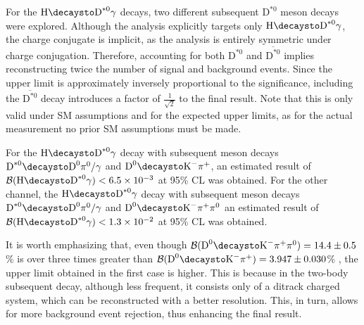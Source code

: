 For the $\text{H}\decaysto \text{D}^{*0}\gamma$ decays, two different subsequent $\text{D}^{*0}$ meson decays were explored. Although the analysis explicitly targets only $\text{H}\decaysto \text{D}^{*0}\gamma$, the charge conjugate is implicit, as the analysis is entirely symmetric under charge conjugation. Therefore, accounting for both $\text{D}^{*0}$ and $\overline{\text{D}^{*0}}$ implies reconstructing twice the number of signal and background events. Since the upper limit is approximately inversely proportional to the significance, including the $\overline{\text{D}^{*0}}$ decay introduces a factor of $\frac{1}{\sqrt{2}}$ to the final result. Note that this is only valid under SM assumptions and for the expected upper limits, as for the actual measurement no prior SM assumptions must be made.

For the $\text{H}\decaysto \text{D}^{*0}\gamma$ decay with subsequent meson decays $\text{D}^{*0}\decaysto \text{D}^{0}\pi^{0}/\gamma$ and $\text{D}^{0}\decaysto \text{K}^{-}\pi^{+}$, an estimated result of $\mathcal{B}(\text{H}\decaysto \text{D}^{*0}\gamma) < 6.5 \times 10^{-3}$ at 95\% CL was obtained. For the other channel, the $\text{H}\decaysto \text{D}^{*0}\gamma$ decay with subsequent meson decays $\text{D}^{*0}\decaysto \text{D}^{0}\pi^{0}/\gamma$ and \linebreak$\text{D}^{0}\decaysto \text{K}^{-}\pi^{+}\pi^{0}$ an estimated result of $\mathcal{B}(\text{H}\decaysto \text{D}^{*0}\gamma) < 1.3 \times 10^{-2}$ at 95\% CL was obtained.

It is worth emphasizing that, even though $\mathcal{B}(\text{D}^{0}\decaysto \text{K}^{-}\pi^{+}\pi^{0}) = 14.4\pm0.5$\% is over three times greater than $\mathcal{B}(\text{D}^{0}\decaysto \text{K}^{-}\pi^{+}) = 3.947\pm0.030$\% \cite{PDG}, the upper limit obtained in the first case is higher. This is because in the two-body subsequent decay, although less frequent, it consists only of a ditrack charged system, which can be reconstructed with a better resolution. This, in turn, allows for more background event rejection, thus enhancing the final result.

